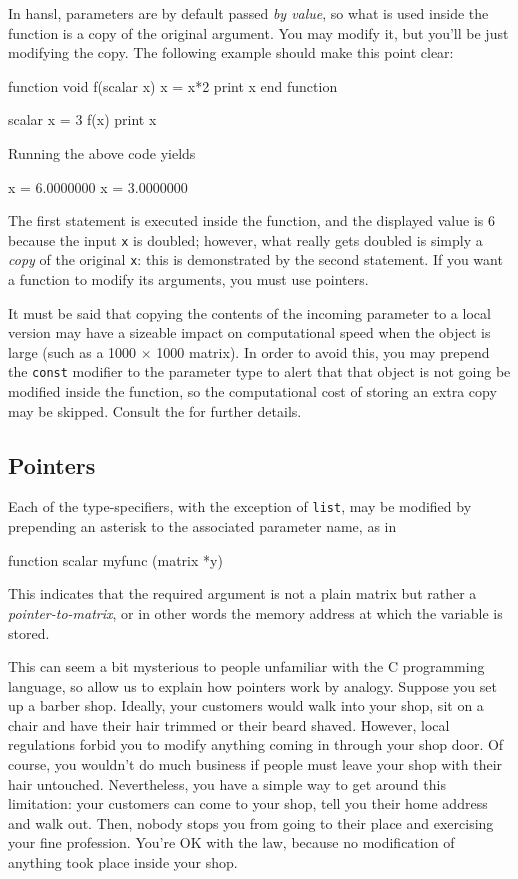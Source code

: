 In hansl, parameters are by default passed \emph{by value}, so what is
used inside the function is a copy of the original argument. You may
modify it, but you'll be just modifying the copy. The following
example should make this point clear:
\begin{code}
function void f(scalar x)
    x = x*2
    print x
end function

scalar x = 3
f(x)
print x
\end{code}
Running the above code yields
\begin{code}
              x =  6.0000000
              x =  3.0000000
\end{code}
The first  statement is executed inside the function, and
the displayed value is 6 because the input \verb|x| is doubled;
however, what really gets doubled is simply a \emph{copy} of the
original \texttt{x}: this is demonstrated by the second 
statement.  If you want a function to modify its arguments, you must
use pointers.

It must be said that copying the contents of the incoming parameter to
a local version may have a sizeable impact on computational speed when
the object is large (such as a 1000 $\times$ 1000 matrix). In order to
avoid this, you may prepend the \texttt{const} modifier to the
parameter type to alert  that that object is not going
be modified inside the function, so the computational cost of storing
an extra copy may be skipped. Consult the \GUG{} for further details.

\subsection{Pointers}

Each of the type-specifiers, with the exception of \texttt{list}, may
be modified by prepending an asterisk to the associated parameter
name, as in
%    
\begin{code}
function scalar myfunc (matrix *y)
\end{code}
This indicates that the required argument is not a plain matrix but
rather a \emph{pointer-to-matrix}, or in other words the memory
address at which the variable is stored.

This can seem a bit mysterious to people unfamiliar with the C
programming language, so allow us to explain how pointers work by
analogy. Suppose you set up a barber shop. Ideally, your customers
would walk into your shop, sit on a chair and have their hair trimmed
or their beard shaved. However, local regulations forbid you to modify
anything coming in through your shop door. Of course, you wouldn't do
much business if people must leave your shop with their hair
untouched. Nevertheless, you have a simple way to get around this
limitation: your customers can come to your shop, tell you their home
address and walk out. Then, nobody stops you from going to their place
and exercising your fine profession. You're OK with the law, because
no modification of anything took place inside your shop.

